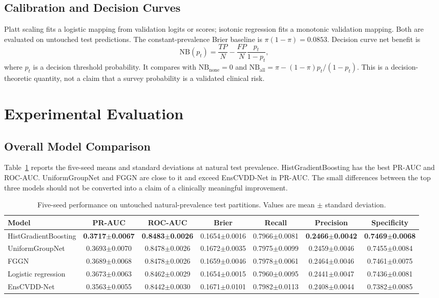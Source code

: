 \documentclass[conference,10pt]{IEEEtran}
\begin{document}
\subsection{Calibration and Decision Curves}
Platt scaling fits a logistic mapping from validation logits or scores; isotonic regression fits a monotonic validation mapping. Both are evaluated on untouched test predictions. The constant-prevalence Brier baseline is $\pi(1-\pi)=0.0853$. Decision curve net benefit is
\begin{equation}
\mathrm{NB}(p_t)=\frac{TP}{N}-\frac{FP}{N}\frac{p_t}{1-p_t},
\end{equation}
where $p_t$ is a decision threshold probability. It compares with $\mathrm{NB}_{\mathrm{none}}=0$ and $\mathrm{NB}_{\mathrm{all}}=\pi-(1-\pi)p_t/(1-p_t)$. This is a decision-theoretic quantity, not a claim that a survey probability is a validated clinical risk.

\section{Experimental Evaluation}
\subsection{Overall Model Comparison}
Table~\ref{tab:main_results} reports the five-seed means and standard deviations at natural test prevalence. HistGradientBoosting has the best PR-AUC and ROC-AUC. UniformGroupNet and FGGN are close to it and exceed EnsCVDD-Net in PR-AUC. The small differences between the top three models should not be converted into a claim of a clinically meaningful improvement.

\begin{table}[t]
\centering
\caption{Five-seed performance on untouched natural-prevalence test partitions. Values are mean $\pm$ standard deviation.}
\label{tab:main_results}
\small
\begin{tabular}{lcccccc}
\toprule
\textbf{Model} & \textbf{PR-AUC} & \textbf{ROC-AUC} & \textbf{Brier} & \textbf{Recall} & \textbf{Precision} & \textbf{Specificity}\\
\midrule
HistGradientBoosting & \textbf{0.3717$\pm$0.0067} & \textbf{0.8483$\pm$0.0026} & 0.1654$\pm$0.0016 & 0.7966$\pm$0.0081 & \textbf{0.2466$\pm$0.0042} & \textbf{0.7469$\pm$0.0068}\\
UniformGroupNet & 0.3693$\pm$0.0070 & 0.8478$\pm$0.0026 & 0.1672$\pm$0.0035 & 0.7975$\pm$0.0099 & 0.2459$\pm$0.0046 & 0.7455$\pm$0.0084\\
FGGN & 0.3689$\pm$0.0068 & 0.8478$\pm$0.0026 & 0.1659$\pm$0.0046 & 0.7978$\pm$0.0061 & 0.2464$\pm$0.0046 & 0.7461$\pm$0.0075\\
Logistic regression & 0.3673$\pm$0.0063 & 0.8462$\pm$0.0029 & 0.1654$\pm$0.0015 & 0.7960$\pm$0.0095 & 0.2441$\pm$0.0047 & 0.7436$\pm$0.0081\\
EnsCVDD-Net & 0.3563$\pm$0.0055 & 0.8442$\pm$0.0030 & 0.1671$\pm$0.0101 & 0.7982$\pm$0.0113 & 0.2408$\pm$0.0044 & 0.7382$\pm$0.0085\\
\bottomrule
\end{tabular}
\end{table}
\end{document}
